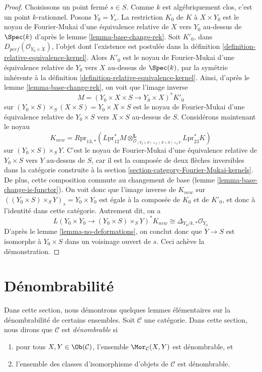 \begin{proof}
Choisissons un point fermé $s \in S$. Comme $k$ est algébriquement clos,
c'est un point $k$-rationnel. Posons $Y_0 = Y_s$. La restriction
$K_0$ de $K$ à $X \times Y_0$ est le noyau de Fourier-Mukai d'une
équivalence relative de $X$ vers $Y_0$ au-dessus de $\Spec(k)$ d'après le
lemme \ref{lemma-base-change-rek}. Soit $K'_0$,
dans $D_{perf}(\mathcal{O}_{Y_0 \times X})$,
l'objet dont l'existence est postulée dans la
définition \ref{definition-relative-equivalence-kernel}.
Alors $K'_0$ est le noyau de Fourier-Mukai d'une
équivalence relative de $Y_0$ vers $X$ au-dessus de $\Spec(k)$,
par la symétrie inhérente à la
définition \ref{definition-relative-equivalence-kernel}.
Ainsi, d'après le
lemme \ref{lemma-base-change-rek},
on voit que l'image inverse
$$
M = (Y_0 \times X \times S \to Y_0 \times X)^*K'_0
$$
sur $(Y_0 \times S) \times_S (X \times S) = Y_0 \times X \times S$
est le noyau de Fourier-Mukai d'une
équivalence relative de $Y_0 \times S$ vers $X \times S$ au-dessus de $S$.
Considérons maintenant le noyau
$$
K_{new} =
R\text{pr}_{13, *}(L\text{pr}_{12}^*M
\otimes_{\mathcal{O}_{(Y_0 \times S) \times_S (X \times S)
\times_S Y}}^\mathbf{L}
L\text{pr}_{23}^*K)
$$
sur $(Y_0 \times S) \times_S Y$. C'est le noyau de Fourier-Mukai d'une
équivalence relative de $Y_0 \times S$ vers $Y$ au-dessus de $S$, car il est
la composée de deux flèches inversibles dans
la catégorie construite à la
section \ref{section-category-Fourier-Mukai-kernels}.
De plus, cette composition commute au changement de base
(lemme \ref{lemma-base-change-is-functor}).
On voit donc que l'image inverse de $K_{new}$ sur
$((Y_0 \times S) \times_S Y)_s = Y_0 \times Y_0$
est égale à la composée de $K_0$ et de $K'_0$,
et donc à l'identité dans cette catégorie.
Autrement dit, on a
$$
L(Y_0 \times Y_0 \to (Y_0 \times S) \times_S Y)^*K_{new}
\cong
\Delta_{Y_0/k, *}\mathcal{O}_{Y_0}
$$
D'après le lemme \ref{lemma-no-deformations}, on conclut donc que $Y \to S$
est isomorphe à $Y_0 \times S$ dans un voisinage ouvert de $s$.
Ceci achève la démonstration.
\end{proof}






\section{Dénombrabilité}
\label{section-countability}

\noindent
Dans cette section, nous démontrons quelques lemmes élémentaires sur la dénombrabilité
de certains ensembles. Soit $\mathcal{C}$ une catégorie. Dans cette section,
nous dirons que $\mathcal{C}$ est {\it dénombrable} si
\begin{enumerate}
\item pour tous $X, Y \in \Ob(\mathcal{C})$, l'ensemble
$\Mor_\mathcal{C}(X, Y)$ est dénombrable, et
\item l'ensemble des classes d'isomorphisme d'objets de $\mathcal{C}$
est dénombrable.
\end{enumerate}

